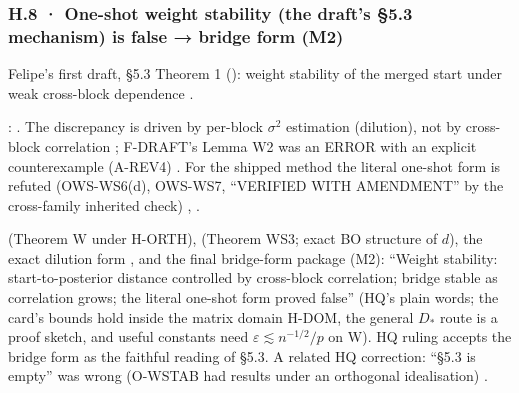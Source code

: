 \subsubsection*{H.8 · One-shot weight stability (the draft's §5.3 mechanism) is false → bridge form (M2)}
\begin{description}[leftmargin=1.3em,style=unboxed,font=\normalfont]
\item[\textbf{Claim.}] Felipe's first draft, §5.3 Theorem 1 (): weight stability of the merged start under weak cross-block dependence .
\item[\textbf{Failed.}] :  . The discrepancy is driven by per-block $\sigma^2$ estimation (dilution), not by cross-block correlation ; F-DRAFT's Lemma W2 was an ERROR with an explicit counterexample (A-REV4) . For the shipped method the literal one-shot form is refuted (OWS-WS6(d), OWS-WS7, ``VERIFIED WITH AMENDMENT'' by the cross-family inherited check) , .
\item[\textbf{Replacement.}]  (Theorem W under H-ORTH),  (Theorem WS3; exact BO structure of $d$), the exact dilution form , and the final bridge-form package  (M2): ``Weight stability: start-to-posterior distance controlled by cross-block correlation; bridge stable as correlation grows; the literal one-shot form proved false''  (HQ's plain words; the card's bounds hold inside the matrix domain H-DOM, the general $D_{*}$ route is a proof sketch, and useful constants need $\varepsilon\lesssim n^{-1/2}/p$ on W). HQ ruling  accepts the bridge form as the faithful reading of §5.3. A related HQ correction: ``§5.3 is empty'' was wrong (O-WSTAB had results under an orthogonal idealisation) .
\end{description}

